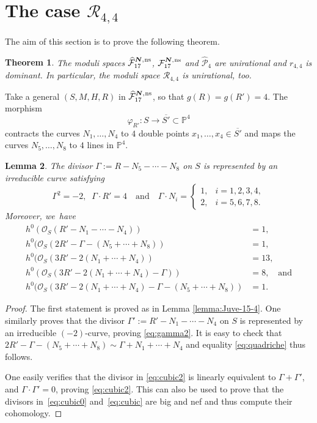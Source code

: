\documentclass[11pt]{article}
\newcommand{\quand}{\quad\text{and}\quad}
\newcommand{\ns}{{\mkern1mu\mathrm{ns}}}
\newcommand{\bN}{\boldsymbol{N}}
\theoremstyle{plain}
\newtheorem{thm}{Theorem}[section]
\newtheorem{lemma}[thm]{Lemma}
\theoremstyle{definition}
\newcommand\PP{{\mathbb P}}
\newcommand\F{{\mathcal F}}
\renewcommand\O{{\mathcal O}}
\renewcommand\P{{\mathcal P}}
\newcommand\R{{\mathcal R}}
\begin{document}
\section{The case \texorpdfstring{$\R_{4,4}$}{R}}

The aim of this section is to prove the following theorem.

\begin{thm}\label{thm:4,4}
The moduli spaces $\widehat{\F}_{17}^{\bN,\ns}$, $\F_{17}^{\bN,\ns}$ and $\widehat\P_{4}$ are unirational and $r_{4,4}$ is dominant. In particular, the moduli space $\R_{4,4}$ is unirational, too.
\end{thm}

Take a general $(S,M,H,R)$ in $\widehat{\F}_{17}^{\bN,\ns}$, so that $g(R)=g(R')=4$. The morphism
\[
\varphi_{R'}:S \to \overline{S'}\subset \PP^4
\]
contracts the curves $N_1,\ldots,N_4$ to $4$ double points $x_1,\ldots,x_4\in \overline{S'}$ and maps the curves \linebreak $N_5,\ldots,N_8$ to $4$ lines in $\PP^4$.

\begin{lemma} \label{lemma:Juve-15-3}
The divisor
$
\Gamma:=R-N_5-\cdots-N_8
$
on $S$ is represented by an irreducible curve satisfying
\[
 \Gamma^2=-2, \;\; \Gamma\cdot R'=4 \quand \Gamma \cdot N_i =
\begin{cases}
1, & i=1,2,3,4, \\
2, & i=5,6,7,8.
\end{cases}
\]
Moreover, we~have
\begin{align}
\label{eq:gamma2}
h^0(\O_S(R'-N_1-\cdots-N_4))&=1, \\
\label{eq:quadriche} h^0(\O_S(2R'-\Gamma-(N_5+\cdots+N_8))&=1,\\
\label{eq:cubic0} h^0(\O_S(3R'-2(N_1+\cdots+N_4))&=13,\\
\label{eq:cubic} h^0(\O_S(3R'-2(N_1+\cdots+N_4)-\Gamma))&=8,\quad\text{and} \\
\label{eq:cubic2} h^0(\O_S(3R'-2(N_1+\cdots+N_4)-\Gamma-(N_5+\cdots+N_8))&=1.
\end{align}
\end{lemma}

\begin{proof}
The first statement is proved as in Lemma \ref{lemma:Juve-15-4}. One similarly proves that the divisor
$
\Gamma':=R'-N_1-\cdots-N_4
$
on $S$ is represented by an irreducible $(-2)$-curve, proving \eqref{eq:gamma2}. It is easy to check that $2R'-\Gamma-(N_5+\cdots+N_8)\sim \Gamma+N_1+\cdots+N_4$ and equality \eqref{eq:quadriche} thus follows.

One easily verifies that the divisor in \eqref{eq:cubic2} is linearly equivalent to $\Gamma +\Gamma'$, and $\Gamma \cdot \Gamma'=0$, proving \eqref{eq:cubic2}.
This can also be used to prove that the divisors in~\eqref{eq:cubic0} and~\eqref{eq:cubic} are big and nef and thus compute their cohomology.
\end{proof}
\end{document}
